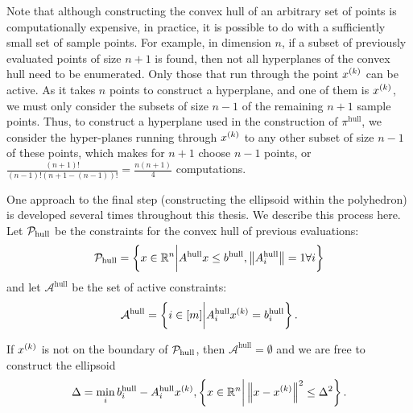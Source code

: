Note that although constructing the convex hull of an arbitrary set of points is computationally expensive,
in practice, it is possible to do with a sufficiently small set of sample points.
For example, in dimension $n$, if a subset of previously evaluated points of size $n+1$ is found, then not all hyperplanes of the convex hull need to be enumerated.
Only those that run through the point $x^{(k)}$ can be active.
As it takes $n$ points to construct a hyperplane, and one of them is $x^{(k)}$, we must only consider the subsets of size $n-1$ of the remaining $n+1$ sample points.
Thus, to construct a hyperplane used in the construction of $\pi^{\textrm{hull}}$,
we consider the hyper-planes running through $x^{(k)}$ to any other subset of size $n - 1$ of these points,
which makes for $n+1$ choose $n-1$ points, or
$
\frac{(n+1)!}{(n-1)!(n+1 - (n-1))!} = \frac{n(n+1) }{4}
$
computations.

One approach to the final step (constructing the ellipsoid within the polyhedron) is developed several times throughout this thesis.
We describe this process here.
Let $\mathcal P_{\textrm{hull}}$ be the constraints for the convex hull of previous evaluations:
\begin{align*}
\mathcal P_{\textrm{hull}} = \left\{x \in \mathbb R^n \bigg | A^{\textrm{hull}} x \le b^{\textrm{hull}}, \left\|A_i^{\textrm{hull}}\right\| = 1 \forall i \right\}
\end{align*}
and let $\mathcal A^{\textrm{hull}}$ be the set of active constraints:
\begin{align*}
\mathcal A^{\textrm{hull}} = \left\{i \in [m] \bigg | A_i^{\textrm{hull}} x^{(k)} = b_i^{\textrm{hull}} \right\}.
\end{align*}

If $x^{(k)}$ is not on the boundary of $\mathcal P_{\textrm{hull}}$, then $\mathcal A^{\textrm{hull}} = \emptyset$ and we are free to construct the ellipsoid
\begin{align*}
\Delta = \min_{i} b_i^{\textrm{hull}} - A_i^{\textrm{hull}} x^{(k)},
\left\{x \in \mathbb R^n \bigg | \left\|x - x^{(k)}\right\|^2 \le \Delta^2\right\}.
\end{align*}
% 

